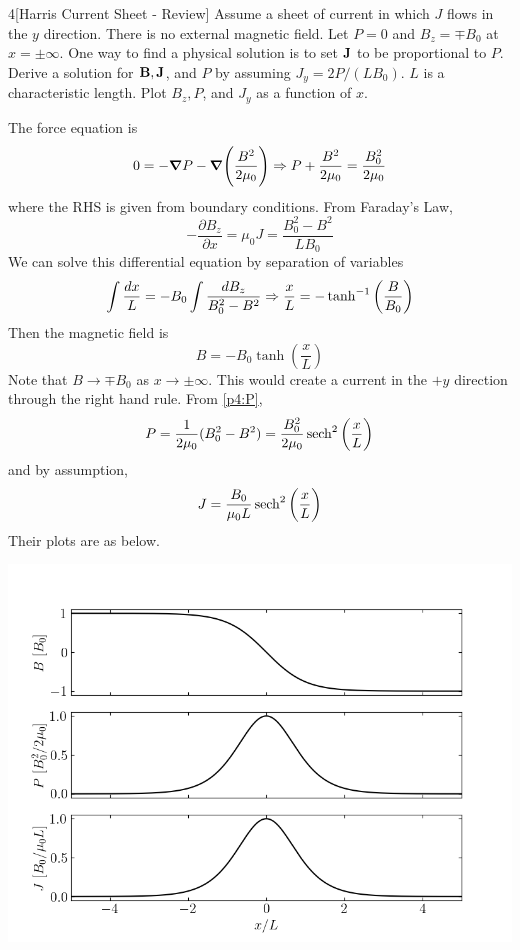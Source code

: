 \documentclass[12pt]{article}
\begin{document}
\begin{problem}{4}[Harris Current Sheet - Review]
Assume a sheet of current in which $J$ flows in the $y$ direction. There is no
external magnetic field. Let $P=0$ and $B_z=\mp B_0$ at $x=\pm\infty$. One way
to find a physical solution is to set $\vb{J}$ to be proportional to $P$. Derive
a solution for $\vb{B},\vb{J}$, and $P$ by assuming $J_y=2P/(LB_0)$. $L$ is a
characteristic length. Plot $B_z,P$, and $J_y$ as a function of $x$.
\begin{solution}
The force equation is
\begin{equation}\label{p4:P}
    0=-\grad P-\grad\qty(\frac{B^2}{2\mu_0}) 
    \Rightarrow P+\frac{B^2}{2\mu_0}=\frac{B_0^2}{2\mu_0}
\end{equation}
where the RHS is given from boundary conditions. From Faraday's Law,
\begin{equation}
    -\frac{\partial B_z}{\partial
    x}=\mu_0J=\frac{B_0^2-B^2}{LB_0} 
\end{equation}
We can solve this differential equation by separation of variables
\begin{equation}
    \int\frac{dx}{L}=-B_0\int\frac{dB_z}{B_0^2-B^2}\Rightarrow\frac{x}{L}=-\tanh^{-1}\qty(\frac{B}{B_0})
\end{equation}
Then the magnetic field is
\begin{equation}
    B=-B_0\tanh(\frac{x}{L}) 
\end{equation}
Note that $B\to\mp B_0$ as $x\to\pm\infty$. This would create a current in the
$+y$ direction through the right hand rule. From \eqref{p4:P},
\begin{equation}
    P=\frac1{2\mu_0}(B_0^2-B^2)=\frac{B_0^2}{2\mu_0}\sech^2\qty(\frac{x}{L}) 
\end{equation}
and by assumption,
\begin{equation}
    J=\frac{B_0}{\mu_0L}\sech^2\qty(\frac{x}{L}) 
\end{equation}
Their plots are as below.
\begin{center}
    \includegraphics[width=1\textwidth]{p4.png} 
\end{center}
\end{solution}
\end{problem}
\end{document}
